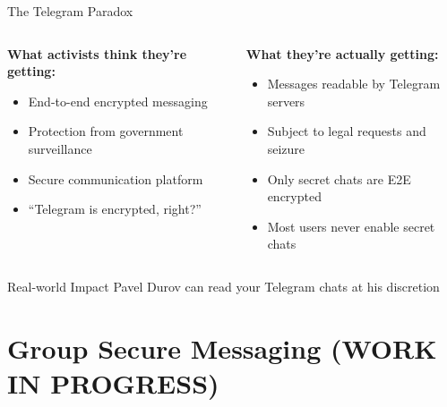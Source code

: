 \documentclass[aspectratio=169, lualatex, handout]{beamer}
\begin{document}
\begin{frame}{The Telegram Paradox}
	\begin{columns}[c]
		\begin{column}{0.5\textwidth}
			\textbf{What activists think they're getting:}
			\begin{itemize}
				\item End-to-end encrypted messaging
				\item Protection from government surveillance
				\item Secure communication platform
				\item ``Telegram is encrypted, right?''
			\end{itemize}
		\end{column}
		\begin{column}{0.5\textwidth}
			\textbf{What they're actually getting:}
			\begin{itemize}
				\item Messages readable by Telegram servers
				\item Subject to legal requests and seizure
				\item Only secret chats are E2E encrypted
				\item Most users never enable secret chats
			\end{itemize}
		\end{column}
	\end{columns}
	\begin{alertblock}{Real-world Impact}
		Pavel Durov can read your Telegram chats at his discretion
	\end{alertblock}
\end{frame}

\section{Group Secure Messaging (WORK IN PROGRESS)}
\end{document}
